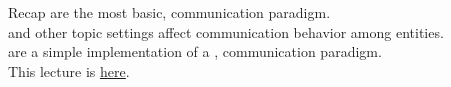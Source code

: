 
\begin{frame}{Recap}
	 are the most basic,  communication paradigm.\\
	\bigskip
	 and other topic settings affect communication behavior among entities.\\
	\bigskip
	 are a simple implementation of a ,  communication paradigm.\\
	\bigskip
	This lecture is \href{https://github.com/robmasocco/DAFN25_Robotics_4}{\color{blue}\underline{here}}.
\end{frame}

